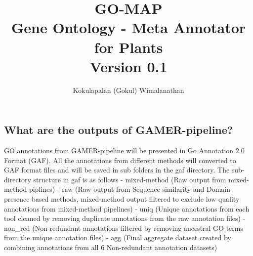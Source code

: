 \documentclass[11pt,letterpaper]{article}
\title{
  \textbf{GO-MAP} \\
  \Large{ \textbf{G}ene \textbf{O}ntology - \textbf{M}eta \textbf{A}nnotator for \textbf{P}lants} \\
  \large {Version 0.1}
}
\author{Kokulapalan (Gokul) Wimalanathan}
\begin{document}

\maketitle
\newpage










\subsection{What are the outputs of
 GAMER-pipeline?}\label{what-are-the-outputs-of-gamer-pipeline}

GO annotations from GAMER-pipeline will be presented in Go Annotation
2.0 Format (GAF). All the annotations from different methods will
converted to GAF format files and will be saved in sub folders in the
gaf directory. The sub-directory structure in gaf is as follows -
mixed-method (Raw output from mixed-method piplines) - raw (Raw output
from Sequence-similarity and Domain-presence based methods, mixed-method
output filtered to exclude low quality annotations from mixed-method
pipelines) - uniq (Unique annotations from each tool cleaned by removing
duplicate annotations from the raw annotation files) - non\_red
(Non-redundant annotations filtered by removing ancestral GO terms from
the unique annotation files) - agg (Final aggregate dataset created by
combining annotations from all 6 Non-redundant annotation datasets)
\end{document}
